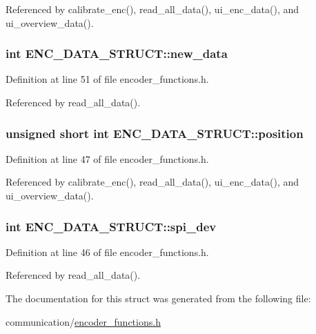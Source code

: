 Referenced by calibrate\_\-enc(), read\_\-all\_\-data(), ui\_\-enc\_\-data(), and ui\_\-overview\_\-data().

\hypertarget{structENC__DATA__STRUCT_adbfb6e5764f0e3c42f4e212deb5d1f21}{
\subsubsection[{new\_\-data}]{\setlength{\rightskip}{0pt plus 5cm}int {\bf ENC\_\-DATA\_\-STRUCT::new\_\-data}}}
\label{structENC__DATA__STRUCT_adbfb6e5764f0e3c42f4e212deb5d1f21}


Definition at line 51 of file encoder\_\-functions.h.



Referenced by read\_\-all\_\-data().

\hypertarget{structENC__DATA__STRUCT_ac3a53ed44ecaf87285518a091e1d2c24}{
\subsubsection[{position}]{\setlength{\rightskip}{0pt plus 5cm}unsigned short int {\bf ENC\_\-DATA\_\-STRUCT::position}}}
\label{structENC__DATA__STRUCT_ac3a53ed44ecaf87285518a091e1d2c24}


Definition at line 47 of file encoder\_\-functions.h.



Referenced by calibrate\_\-enc(), read\_\-all\_\-data(), ui\_\-enc\_\-data(), and ui\_\-overview\_\-data().

\hypertarget{structENC__DATA__STRUCT_a93b8e925392a12a8874bf59f2a1cd76a}{
\subsubsection[{spi\_\-dev}]{\setlength{\rightskip}{0pt plus 5cm}int {\bf ENC\_\-DATA\_\-STRUCT::spi\_\-dev}}}
\label{structENC__DATA__STRUCT_a93b8e925392a12a8874bf59f2a1cd76a}


Definition at line 46 of file encoder\_\-functions.h.



Referenced by read\_\-all\_\-data().



The documentation for this struct was generated from the following file:\begin{DoxyCompactItemize}
\item 
communication/\hyperlink{encoder__functions_8h}{encoder\_\-functions.h}\end{DoxyCompactItemize}
